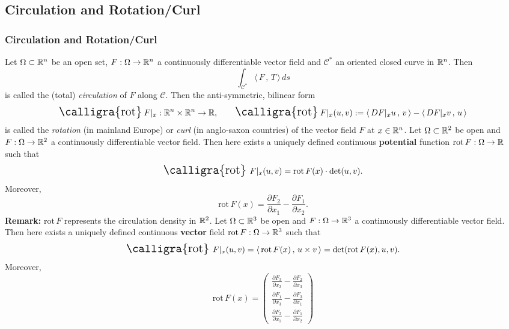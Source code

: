 \documentclass[11pt, t]{beamer}
\renewcommand{\emph}[1]{{\color{Turquoise3}\textsl{#1}}}
\newcommand{\rot}{\text{\Large{\calligra{rot}}\,}}
\newcommand{\Remark}{\textbf{Remark: }}
\newcommand{\scp}[2]{\langle\,#1\,,\,#2\,\rangle} \newcommand{\scpp}{\langle\,\cdot\,,\,\cdot\,\rangle}
\begin{document}
\subsection{Circulation and Rotation/Curl}
\begin{frame}[allowframebreaks]
    \frametitle{Circulation and Rotation/Curl}

    Let $\Omega\subset\mathbb{R}^n$ be an open set, $F:\Omega\to\mathbb{R}^n$ a continuously dif{}ferentiable vector field and $\mathcal{C}^*$ an oriented closed curve in $\mathbb{R}^n$. Then
    \begin{equation*}\label{3.2.1}
        \int_{\mathcal{C}^*}\scp{F}{T}\,ds
    \end{equation*}
    is called the (total) \emph{circulation} of $F$ along $\mathcal{C}$. Then the anti-symmetric, bilinear form
    \begin{equation*}\label{3.2.3}
        \rot F|_x:\R^n\times\R^n\to\R,\qquad
        \rot F|_x(u,v):=\scp{DF|_xu}{v}-\scp{DF|_xv}{u}
    \end{equation*}
    is called the \emph{rotation} (in mainland Europe) or \emph{curl} (in anglo-saxon countries) of the vector field $F$ at $x\in\mathbb{R}^n$.
    \newpage
    Let $\Omega\subset\mathbb{R}^2$ be open and $F:\Omega\to\mathbb{R}^2$ a continuously dif{}ferentiable vector field. Then here exists a uniquely defined continuous \textbf{potential} function $\text{rot}\,F:\Omega\to\mathbb{R}$ such that
    \begin{equation*}\label{3.2.5}
        \rot\,F|_x(u,v)=\text{rot}\,F(x)\cdot
        \det(u,v).
    \end{equation*}
    Moreover, $$\text{rot}\,F(x)=\frac{\partial F_2}{\partial x_1}-\frac{\partial F_1}{\partial x_2}.$$
    \Remark $\text{rot}\,F$ represents the circulation density in $\mathbb{R}^2$.
    \newpage
    Let $\Omega\subset\mathbb{R}^3$ be open and $F:\Omega\to\mathbb{R}^3$ a continuously dif{}ferentiable vector field. Then here exists a uniquely defined continuous \textbf{vector} field $\text{rot}\,F:\Omega\to\mathbb{R}^3$ such that
    \begin{equation*}\label{3.2.7}
        \rot\,F|_x(u,v)=\scp{\text{rot}\,F(x)}{u\times v}=\det(\text{rot}\,F(x),u,v).
    \end{equation*}
    Moreover, \[\text{rot}\,F(x)=\begin{pmatrix}
            \frac{\partial F_3}{\partial x_2}-\frac{\partial F_2}{\partial x_3} \\[4pt]
            \frac{\partial F_1}{\partial x_3}-\frac{\partial F_3}{\partial x_1} \\[4pt]
            \frac{\partial F_2}{\partial x_1}-\frac{\partial F_1}{\partial x_2}

\end{pmatrix}\]
\end{frame}
\end{document}
